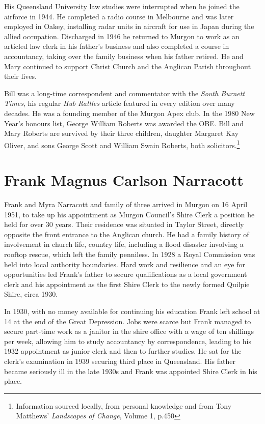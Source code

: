 His Queensland University law studies were interrupted when he joined the airforce in 1944. He completed a radio course in Melbourne and was later employed in Oakey, installing radar units in aircraft for use in Japan during the allied occupation. Discharged in 1946 he returned to Murgon to work as an articled law clerk in his father's business and also completed a course in accountancy, taking over the family business when his father retired. He and Mary continued to support Christ Church and the Anglican Parish throughout their lives.



Bill was a long-time correspondent and commentator with the \emph{South Burnett Times}, his regular \emph{Hub Rattles} article featured in every edition over many decades. He was a founding member of the Murgon Apex club. In the 1980 New Year's honours list, George William Roberts was awarded the OBE. Bill and Mary Roberts are survived by their three children, daughter Margaret Kay Oliver, and sons George Scott and William Swain Roberts, both solicitors.\footnote{Information sourced locally, from personal knowledge and from Tony Matthews' \emph{Landscapes of Change}, Volume 1, p.450}


\section{Frank Magnus Carlson Narracott}



Frank and Myra Narracott and family of three arrived in Murgon on 16 April 1951, to take up his appointment as Murgon Council's Shire Clerk a position he held for over 30 years. Their residence was situated in Taylor Street, directly opposite the front entrance to the Anglican church. He had a family history of involvement in church life, country life, including a flood disaster involving a rooftop rescue, which left the family penniless. In 1928 a Royal Commission was held into local authority boundaries. Hard work and resilience and an eye for opportunities led Frank's father to secure qualifications as a local government clerk and his appointment as the first Shire Clerk to the newly formed Quilpie Shire, circa 1930.



In 1930, with no money available for continuing his education Frank left school at 14 at the end of the Great Depression. Jobs were scarce but Frank managed to secure part-time work as a janitor in the shire office with a wage of ten shillings per week, allowing him to study accountancy by correspondence, leading to his 1932 appointment as junior clerk and then to further studies. He sat for the clerk's examination in 1939 securing third place in Queensland. His father became seriously ill in the late 1930s and Frank was appointed Shire Clerk in his place.



